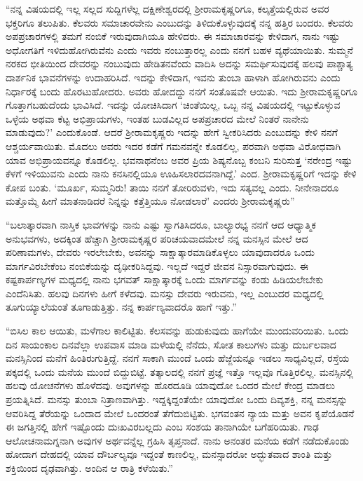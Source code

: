 “ನನ್ನ ವಿಷಯದಲ್ಲಿ ಇಲ್ಲ ಸಲ್ಲದ ಸುದ್ದಿಗಳೆಲ್ಲ ದಕ್ಷಿಣೇಶ್ವರದಲ್ಲಿ ಶ‍್ರೀರಾಮಕೃಷ್ಣರಿಗೂ, ಕಲ್ಕತ್ತೆಯಲ್ಲಿರುವ ಅವರ ಭಕ್ತರಿಗೂ ತಲುಪಿತು. ಕೆಲವರು ಸಮಾಚಾರವೇನು ಎಂಬುದನ್ನು ತಿಳಿದುಕೊಳ್ಳುವುದಕ್ಕೆ ನನ್ನ ಹತ್ತಿರ ಬಂದರು. ಕೆಲವರು ಅಪಪ್ರಚಾರಗಳಲ್ಲಿ ತಮಗೆ ನಂಬಿಕೆ ಇರುವುದಾಗಿಯೂ ಹೇಳಿದರು. ಈ ಸಮಾಚಾರವನ್ನು ಕೇಳಿದಾಗ, ನಾನು ಇಷ್ಟು ಅಧೋಗತಿಗೆ ಇಳಿದುಹೋಗಿರುವೆನು ಎಂದು ಇವರು ನಂಬುತ್ತಾರಲ್ಲ ಎಂದು ನನಗೆ ಬಹಳ ವ್ಯಥೆಯಾಯಿತು. ಸುಮ್ಮನೆ ನರಕದ ಭೀತಿಯಿಂದ ದೇವರನ್ನು ನಂಬುವುದು ಹೇಡಿತನವೆಂದು ವಾದಿಸಿ ಅದನ್ನು ಸಮರ್ಥಿಸುವುದಕ್ಕೆ ಹಲವು ಪಾಶ್ಚಾತ್ಯ ದಾರ್ಶನಿಕ ಭಾವನೆಗಳನ್ನು ಉದಾಹರಿಸಿದೆ. ಇದನ್ನು ಕೇಳಿದಾಗ, ಇವನು ತುಂಬಾ ಹಾಳಾಗಿ ಹೋಗಿರುವನು ಎಂದು ನಿರ್ಧಾರಕ್ಕೆ ಬಂದು ಹೊರಟುಹೋದರು. ಅವರು ಹೋದದ್ದು ನನಗೆ ಸಂತೊಷವೇ ಆಯಿತು. ಇದು ಶ‍್ರೀರಾಮಕೃಷ್ಣರಿಗೂ ಗೊತ್ತಾಗಬಹುದೆಂದು ಭಾವಿಸಿದೆ. ಇದನ್ನು ಯೋಚಿಸಿದಾಗ ‘ಚಿಂತೆಯಿಲ್ಲ, ಒಬ್ಬ ನನ್ನ ವಿಷಯದಲ್ಲಿ ಇಟ್ಟುಕೊಳ್ಳುವ ಒಳ್ಳೆಯ ಅಥವಾ ಕೆಟ್ಟ ಅಭಿಪ್ರಾಯಗಳು, ಇಂತಹ ಬುಡವಿಲ್ಲದ ಅಪಪ್ರಚಾರದ ಮೇಲೆ ನಿಂತರೆ ನಾನೇನು ಮಾಡುವುದು?’ ಎಂದುಕೊಂಡೆ. ಆದರೆ ಶ‍್ರೀರಾಮಕೃಷ್ಣರು ಇದನ್ನು ಹೇಗೆ ಸ್ವೀಕರಿಸಿದರು ಎಂಬುದನ್ನು ಕೇಳಿ ನನಗೆ ಆಶ್ಚರ್ಯವಾಯಿತು. ಮೊದಲು ಅವರು ಇದರ ಕಡೆಗೆ ಗಮನವನ್ನೇ ಕೊಡಲಿಲ್ಲ, ಪರವಾಗಿ ಅಥವಾ ವಿರೋಧವಾಗಿ ಯಾವ ಅಭಿಪ್ರಾಯವನ್ನೂ ಕೊಡಲಿಲ್ಲ. ಭವನಾಥನೆಂಬ ಅವರ ಪ್ರಿಯ ಶಿಷ್ಯನೊಬ್ಬ ಕಂಬನಿ ಸುರಿಸುತ್ತ ‘ನರೇಂದ್ರ ಇಷ್ಟು ಕೆಳಗೆ ಇಳಿಯುವನು ಎಂದು ನಾನು ಕನಸಿನಲ್ಲಿಯೂ ಊಹಿಸಲಾರದವನಾಗಿದ್ದೆ.’ ಎಂದ. ಶ‍್ರೀರಾಮಕೃಷ್ಣರಿಗೆ ಇದನ್ನು ಕೇಳಿ ಕೋಪ ಬಂತು. ‘ಮೂರ್ಖ, ಸುಮ್ಮನಿರು! ತಾಯಿ ನನಗೆ ತೋರಿರುವಳು, ಇದು ಸತ್ಯವಲ್ಲ ಎಂದು. ನೀನೇನಾದರೂ ಮತ್ತೊಮ್ಮೆ ಹೀಗೆ ಮಾತನಾಡಿದರೆ ನಿನ್ನನ್ನು ಕತ್ತೆತ್ತಿಯೂ ನೋಡಲಾರೆ’ ಎಂದರು ಶ‍್ರೀರಾಮಕೃಷ್ಣರು”

“ಬಲಾತ್ಕಾರವಾಗಿ ನಾಸ್ತಿಕ ಭಾವಗಳನ್ನು ನಾನು ಎಷ್ಟು ಸ್ವಾಗತಿಸಿದರೂ, ಬಾಲ್ಯಾರಭ್ಯ ನನಗೆ ಆದ ಆಧ್ಯಾತ್ಮಿಕ ಅನುಭವಗಳು, ಅದಕ್ಕಿಂತ ಹೆಚ್ಚಾಗಿ ಶ‍್ರೀರಾಮಕೃಷ್ಣರ ಪರಿಚಯವಾದಮೇಲೆ ನನ್ನ ಮನಸ್ಸಿನ ಮೇಲೆ ಆದ ಪರಿಣಾಮಗಳು, ದೇವರು ಇರಲೇಬೇಕು, ಅವನನ್ನು ಸಾಕ್ಷಾತ್ಕಾರಮಾಡಿಕೊಳ್ಳಲು ಯಾವುದಾದರೂ ಒಂದು ಮಾರ್ಗವಿರಬೇಕೆಂಬ ನಂಬಿಕೆಯನ್ನು ದೃಢೀಕರಿಸಿದ್ದವು. ಇಲ್ಲದೆ ಇದ್ದರೆ ಜೀವನ ನಿಸ್ಸಾರವಾಗುವುದು. ಈ ಕಷ್ಟಕಾರ್ಪಣ್ಯಗಳ ಮಧ್ಯದಲ್ಲಿ ನಾನು ಭಗವತ್ ಸಾಕ್ಷಾತ್ಕಾರಕ್ಕೆ ಒಂದು ಮಾರ್ಗವನ್ನು ಕಂಡು ಹಿಡಿಯಲೇಬೇಕು ಎಂದೆನಿಸಿತು. ಹಲವು ದಿನಗಳು ಹೀಗೆ ಕಳೆದವು. ಮನಸ್ಸು ದೇವರು ಇರುವನು, ಇಲ್ಲ ಎಂಬುದರ ಮಧ್ಯದಲ್ಲಿ ತೂಗುಯ್ಯಾಲೆಯಂತೆ ತೂಗಾಡುತ್ತಿತ್ತು. ನನ್ನ ಕಾರ್ಪಣ್ಯವಾದರೊ ಹಾಗೆ ಇತ್ತು.”

“ಬಿಸಿಲ ಕಾಲ ಆಯಿತು, ಮಳೆಗಾಲ ಕಾಲಿಟ್ಟಿತು. ಕೆಲಸವನ್ನು ಹುಡುಕುವುದು ಹಾಗೆಯೇ ಮುಂದುವರಿಯಿತು. ಒಂದು ದಿನ ಸಾಯಂಕಾಲ ದಿನವೆಲ್ಲಾ ಉಪವಾಸ ಮಾಡಿ ಮಳೆಯಲ್ಲಿ ನೆನೆದು, ಸೋತ ಕಾಲುಗಳು ಮತ್ತು ದುರ್ಬಲವಾದ ಮನಸ್ಸಿನಿಂದ ಮನೆಗೆ ಹಿಂತಿರುಗುತ್ತಿದ್ದೆ. ನನಗೆ ಸಾಕಾಗಿ ಮುಂದೆ ಒಂದು ಹೆಜ್ಜೆಯನ್ನೂ ಇಡಲು ಸಾಧ್ಯವಿಲ್ಲದೆ, ರಸ್ತೆಯ ಪಕ್ಕದಲ್ಲಿ ಒಂದು ಮನೆಯ ಮುಂದೆ ಬಿದ್ದುಬಿಟ್ಟೆ. ತತ್ಕಾಲದಲ್ಲಿ ನನಗೆ ಪ್ರಜ್ಞೆ ಇತ್ತೊ ಇಲ್ಲವೊ ಗೊತ್ತಿರಲಿಲ್ಲ. ಮನಸ್ಸಿನಲ್ಲಿ ಹಲವು ಯೋಚನೆಗಳು ಹೊಳೆದವು. ಅವುಗಳನ್ನು ಹೊರದೂಡಿ ಯಾವುದೋ ಒಂದರ ಮೇಲೆ ಕೇಂದ್ರ ಮಾಡಲು ಪ್ರಯತ್ನಿಸಿದೆ. ಮನಸ್ಸು ತುಂಬಾ ನಿತ್ರಾಣವಾಗಿತ್ತು. ಇದ್ದಕ್ಕಿದ್ದಂತೆಯೇ ಯಾವುದೋ ಒಂದು ದಿವ್ಯಶಕ್ತಿ, ನನ್ನ ಮನಸ್ಸನ್ನು ಆವರಿಸಿದ್ದ ತೆರೆಯನ್ನು ಒಂದಾದ ಮೇಲೆ ಒಂದರಂತೆ ತೆಗೆದುಬಿಟ್ಟಿತು. ಭಗವಂತನ ನ್ಯಾಯ ಮತ್ತು ಅವನ ಕೃಪೆಯೊಡನೆ ಈ ಜಗತ್ತಿನಲ್ಲಿ ಹೇಗೆ ಇಷ್ಟೊಂದು ದುಃಖವಿರಬಲ್ಲದು ಎಂಬ ಸಂಶಯ ತಾನಾಗಿಯೇ ಬಗೆಹರಿಯಿತು. ಗಾಢ ಆಲೋಚನಾಮಗ್ನನಾಗಿ ಅವುಗಳ ಅರ್ಥವನ್ನೆಲ್ಲ ಗ್ರಹಿಸಿ ತೃಪ್ತನಾದೆ. ನಾನು ಅನಂತರ ಮನೆಯ ಕಡೆಗೆ ನಡೆದುಕೊಂಡು ಹೋದಾಗ ದೇಹದಲ್ಲಿ ಯಾವ ದೌರ್ಬಲ್ಯವೂ ಇದ್ದಂತೆ ಕಾಣಲಿಲ್ಲ, ಮನಸ್ಸಾದರೋ ಅದ್ಭುತವಾದ ಶಾಂತಿ ಮತ್ತು ಶಕ್ತಿಯಿಂದ ದೃಢವಾಗಿತ್ತು. ಅಂದಿನ ಆ ರಾತ್ರಿ ಕಳೆಯಿತು.”

